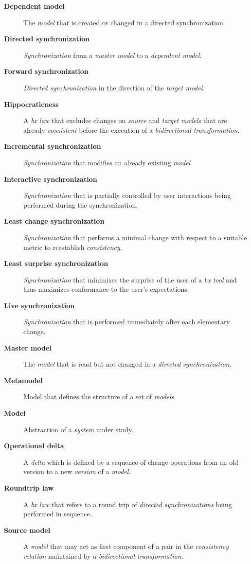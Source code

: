 \begin{description}
	\item[\textbf{Dependent model}] The \emph{model} that is created or changed in a directed synchronization.
	\item[\textbf{Directed synchronization}] \emph{Synchronization} from a \emph{master model} to a \emph{dependent model}.
	\item[\textbf{Forward synchronization}] \emph{Directed synchronization} in the direction of the \emph{target model}.
	\item[\textbf{Hippocraticness}] A \emph{bx law} that excludes changes on \emph{source} and \emph{target models} that are already \emph{consistent} before the execution of a \emph{bidirectional transformation}.
	\item[\textbf{Incremental synchronization}] \emph{Synchronization} that modifies an already existing \emph{model}
	\item[\textbf{Interactive synchronization}] \emph{Synchronization} that is partially controlled by user interactions being performed during the synchronization.
	\item[\textbf{Least change synchronization}] \emph{Synchronization} that performs a minimal change with respect to a suitable metric to reestablish \emph{consistency}.
	\item[\textbf{Least surprise synchronization}] \emph{Synchronization} that minimizes the surprise of the user of a \emph{bx tool} and thus maximizes conformance to the user's expectations.
	\item[\textbf{Live synchronization}] \emph{Synchronization} that is performed immediately after each elementary change. 
	\item[\textbf{Master model}] The \emph{model} that is read but not changed in a \emph{directed synchronization}.
	\item[\textbf{Metamodel}] Model that defines the structure of a set of \emph{models}.
	\item[\textbf{Model}] Abstraction of a \emph{system} under study.
	\item[\textbf{Operational delta}] A \emph{delta} which is defined by a sequence of change operations from an old version to a new \emph{version} of a \emph{model}.
	\item[\textbf{Roundtrip law}] A \emph{bx law} that refers to a round trip of \emph{directed synchronizations} being performed in sequence. 
	\item[\textbf{Source model}] A \emph{model} that may act as first component of a pair in the \emph{consistency relation} maintained by a \emph{bidirectional transformation}. 

\end{description}
